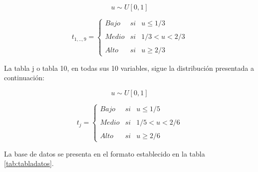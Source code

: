 \documentclass[mathematics,article,submit,moreauthors,pdftex]{mdpi}
\begin{document}
\[ u \sim U[0,1]\]

\[t_{1,..,9}= \left\{ \begin{array}{lcc}
             Bajo &   si  & u \leq 1/3 \\
             \\ Medio &  si & 1/3 < u < 2/3 \\
             \\ Alto &  si  & u \geq 2/3 
             \end{array}
   \right. \]

La tabla j o tabla 10, en todas sus 10 variables, sigue la distribución
presentada a continuación:

\[ u \sim U[0,1]\]

\[t_{j}= \left\{ \begin{array}{lcc}
             Bajo &   si  & u \leq 1/5 \\
             \\ Medio &  si & 1/5 < u < 2/6 \\
             \\ Alto &  si  & u \geq 2/6 
             \end{array}
   \right. \]

La base de datos se presenta en el formato establecido en la tabla
\ref{tab:tabladatos}.
\end{document}
